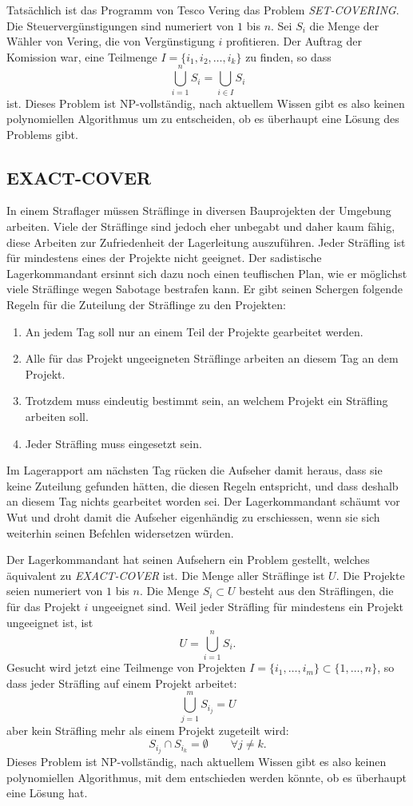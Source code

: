 \medskip

Tatsächlich ist das Programm von Tesco Vering das Problem {\it SET-COVERING}.
Die Steuervergünstigungen sind numeriert von $1$ bis $n$.
Sei $S_i$ die Menge der Wähler von Vering, die von Vergünstigung $i$
profitieren.
Der Auftrag der Komission war, eine Teilmenge
$I=\{i_1,i_2,\dots,i_k\}$ zu finden, so dass
\[
\bigcup_{i=1}^nS_i=\bigcup_{i\in I}S_i
\]
ist.
Dieses Problem ist NP-vollständig, nach aktuellem Wissen gibt
es also keinen polynomiellen Algorithmus um zu entscheiden, ob es
überhaupt eine Lösung des Problems gibt.

\subsection{EXACT-COVER}
In einem Straflager müssen Sträflinge in diversen Bauprojekten
der Umgebung arbeiten.
Viele der Sträflinge sind jedoch eher unbegabt und daher kaum
fähig, diese Arbeiten zur Zufriedenheit der Lagerleitung auszuführen.
Jeder Sträfling ist für mindestens eines der Projekte nicht geeignet.
Der sadistische Lagerkommandant ersinnt sich dazu noch einen teuflischen
Plan, wie er möglichst viele Sträflinge wegen Sabotage bestrafen kann.
Er gibt seinen Schergen folgende Regeln für die Zuteilung der Sträflinge
zu den Projekten:
\begin{enumerate}
\item
An jedem Tag soll nur an einem Teil der Projekte gearbeitet werden.
\item
Alle für das Projekt ungeeigneten Sträflinge arbeiten an diesem Tag
an dem Projekt.
\item
Trotzdem muss eindeutig bestimmt sein, an welchem Projekt ein Sträfling
arbeiten soll.
\item
Jeder Sträfling muss eingesetzt sein.
\end{enumerate}
Im Lagerapport am nächsten Tag rücken die Aufseher damit heraus, dass
sie keine Zuteilung gefunden hätten, die diesen Regeln entspricht, und
dass deshalb an diesem Tag nichts gearbeitet worden sei.
Der Lagerkommandant schäumt vor Wut und droht damit die Aufseher eigenhändig
zu erschiessen, wenn sie sich weiterhin seinen Befehlen widersetzen
würden.

\medskip

Der Lagerkommandant hat seinen Aufsehern ein Problem gestellt, welches
äquivalent zu {\it EXACT-COVER} ist.
Die Menge aller Sträflinge ist $U$.
Die Projekte seien numeriert
von $1$ bis $n$.
Die Menge $S_i\subset U$ besteht aus den Sträflingen, die
für das Projekt $i$ ungeeignet sind.
Weil jeder Sträfling für mindestens
ein Projekt ungeeignet ist, ist 
\[
U=\bigcup_{i=1}^n S_i.
\]
Gesucht wird jetzt eine Teilmenge von Projekten
$I=\{i_1,\dots,i_m\}\subset\{1,\dots,n\}$, so dass 
jeder Sträfling auf einem Projekt arbeitet:
\[
\bigcup_{j=1}^m S_{i_j}=U
\]
aber kein Sträfling mehr als einem Projekt zugeteilt wird:
\[
S_{i_j}\cap S_{i_k}=\emptyset\qquad \forall j\ne k.
\]
Dieses Problem ist NP-vollständig, nach aktuellem Wissen gibt es
also keinen polynomiellen Algorithmus, mit dem entschieden werden
könnte, ob es überhaupt eine Lösung hat.

